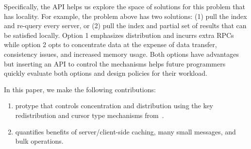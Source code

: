 Specifically, the API helps us explore the space of solutions for this problem
that has locality. For example, the problem above has two solutions: (1) pull
the index and re-query every server, or (2) pull the index and partial set of
results that can be satisfied locally. Option 1 emphasizes distribution and
incurrs extra RPCs while option 2 opts to concentrate data at the expense of
data transfer, consistency issues, and increased memory usage.  Both options
have advantages but inserting an API to control the mechanisms helps future
programmers quickly evaluate both options and design policies for their
workload.

In this paper, we make the following contributions:

\begin{enumerate}

  \item protype that controls concentration and distribution using the key
  redistribution and cursor type mechanisms
  from~\cite{greenberg:hotstorage2015-mdhim}. 

  \item quantifies benefits of server/client-side caching, many small messages,
  and bulk operations.

\end{enumerate}

